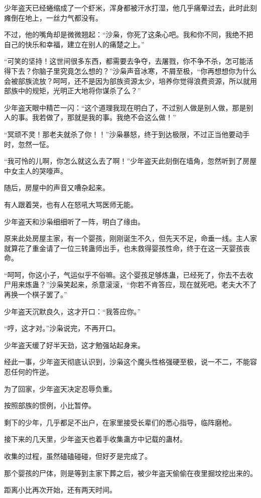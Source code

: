 \begin{this_body}
少年盗天已经蜷缩成了一个虾米，浑身都被汗水打湿，他几乎痛晕过去，此时此刻瘫倒在地上，一丝力气都没有。

不过，他的嘴角却是微微翘起：“沙枭，你死了这条心吧。我和你不同，我绝不把自己的快乐和幸福，建立在别人的痛楚之上。”

“可笑的坚持！这世间很多东西，都需要去争夺，去屠戮，你不争不杀，怎可能活得下去？你脑子里究竟怎么想的？”沙枭声音冰寒，不屑至极，“你再想想你为什么会被部族流放？呵呵，还不是因为部族资源太少，培养你觉得浪费资源，所以就用部族中的规矩，光明正大地将你谋杀了么？”

少年盗天眼中精芒一闪：“这个道理我现在明白了，不过别人做是别人做，那是别人的事。我若做了，那就是我的事。我绝不会这么做！”

“冥顽不灵！那老夫就杀了你！！”沙枭暴怒，终于到达极限，不过正当他要动手时，忽然一怔。

“我可怜的儿啊，你怎么就这么去了啊！”少年盗天此刻倒在墙角，忽然听到了房屋中女主人的哭嚎声。

随后，房屋中的声音又嘈杂起来。

有人跟着哭，也有人在怒吼大骂医师无能。

少年盗天和沙枭细细听了一阵，明白了缘由。

原来此处房屋主家，有一个婴孩，刚刚诞生不久，但先天不足，命垂一线。主人家就算花了重金请了一位三转蛊师出手，也未救得婴孩性命，终于在这一天婴孩丧命。

“呵呵，你这小子，气运似乎不俗嘛。这个婴孩足够炼蛊，已经死了，你去不去收尸用来炼蛊？”沙枭笑起来，杀意滚滚，“你若不肯答应，现在就死吧。老夫大不了再换一个棋子罢了。”

少年盗天沉默良久，这才开口：“我答应你。”

“哼，这才对。”沙枭说完，不再开口。

少年盗天缓了好半天劲，这才勉强站起身来。

经此一事，少年盗天彻底认识到，沙枭这个魔头性格强硬至极，说一不二，不能容忍任何的忤逆。

为了回家，少年盗天决定忍辱负重。

按照部族的惯例，小比暂停。

剩下的少年，几乎都足不出户，在家里接受长辈们的悉心指导，临阵磨枪。

接下来的几天里，少年盗天也着手收集蛊方中记载的蛊材。

收集的过程，虽然磕磕碰碰，但好歹是完成了。

那个婴孩的尸体，则是等到主家下葬之后，被少年盗天偷偷在夜里掘坟挖出来的。

距离小比再次开始，还有两天时间。


\end{this_body}
